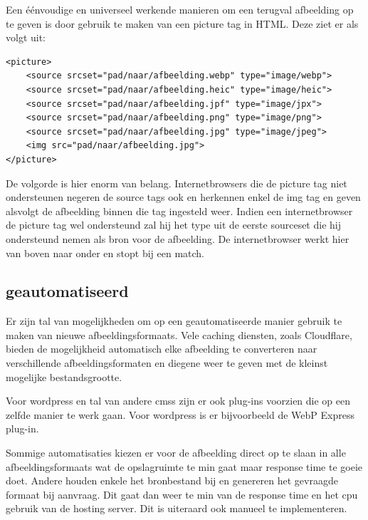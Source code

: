 Een éénvoudige en universeel werkende manieren om een terugval afbeelding op te geven is door gebruik te maken van een picture tag in HTML. Deze ziet er als volgt uit:

\begin{lstlisting}[style=htmlcssjs]
<picture>
	<source srcset="pad/naar/afbeelding.webp" type="image/webp">
	<source srcset="pad/naar/afbeelding.heic" type="image/heic">
	<source srcset="pad/naar/afbeelding.jpf" type="image/jpx">
	<source srcset="pad/naar/afbeelding.png" type="image/png"> 
	<source srcset="pad/naar/afbeelding.jpg" type="image/jpeg"> 
	<img src="pad/naar/afbeelding.jpg">
</picture>
\end{lstlisting}

De volgorde is hier enorm van belang. Internetbrowsers die de picture tag niet ondersteunen negeren de source tags ook en herkennen enkel de img tag en geven alsvolgt de afbeelding binnen die tag ingesteld weer. Indien een internetbrowser de picture tag wel ondersteund zal hij het type uit de eerste sourceset die hij ondersteund nemen als bron voor de afbeelding. De internetbrowser werkt hier van boven naar onder en stopt bij een match.

\subsection{geautomatiseerd}
\label{sec:afbeeldingscompressie-implementatie-web-automated}

Er zijn tal van mogelijkheden om op een geautomatiseerde manier gebruik te maken van nieuwe \glspl{afbeeldingsformaat}. Vele caching diensten, zoals Cloudflare, bieden de mogelijkheid automatisch elke afbeelding te converteren naar verschillende afbeeldingsformaten en diegene weer te geven met de kleinst mogelijke bestandsgrootte. 

Voor \gls{wordpress} en tal van andere \glspl{cms} zijn er ook \glspl{plug-in} voorzien die op een zelfde manier te werk gaan. Voor \gls{wordpress} is er bijvoorbeeld de WebP Express  \gls{plug-in}.

Sommige automatisaties kiezen er voor de afbeelding direct op te slaan in alle \glspl{afbeeldingsformaat} wat de opslagruimte te min gaat maar response time te goeie doet. Andere houden enkele het bronbestand bij en genereren het gevraagde formaat bij aanvraag. Dit gaat dan weer te min van de response time en het cpu gebruik van de \gls{hosting} server. Dit is uiteraard ook manueel te implementeren.

